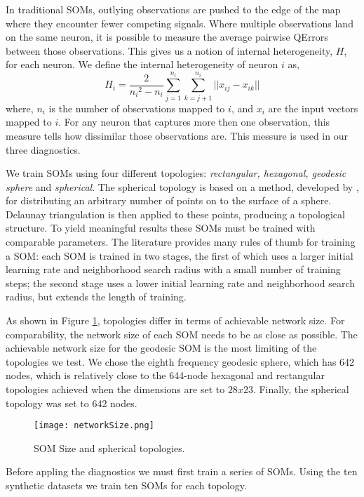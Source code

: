 In traditional SOMs, outlying observations are pushed to the edge of the map
where they encounter fewer competing signals.
Where multiple observations land on the same neuron, it is possible to measure
the average pairwise QErrors between those observations.  This gives us a
notion of internal heterogeneity, \(H\), for each neuron.  We define the
internal heterogeneity of neuron \(i\) as,
 \begin{equation}
   {H_i} = \frac{2}{{n_i}^2-{n_i}}\sum_{j=1}^{n_i}\sum_{k=j+1}^{n_i} ||{x_{ij}}-{x_{ik}}||
 \label{eqno1}
 \end{equation}
where, \(n_i\) is the number of observations mapped to \(i\), and \(x_i\) are
the input vectors mapped to \(i\).  For any neuron that captures more then one
observation, this measure tells how dissimilar those observations are.  This
messure is used in our three diagnostics.

We train SOMs using four different topologies:
\emph{rectangular, hexagonal, geodesic sphere} and \emph{spherical}.  The spherical
topology is based on a method, developed by \cite{Rakhmanov94}, for
distributing an arbitrary number of points on to the surface of a sphere.
Delaunay triangulation is then applied to these points, producing a
topological structure.  To yield meaningful results these SOMs must be trained
with comparable parameters.  The literature provides many rules of thumb for
training a SOM: each SOM is trained in two stages, the first of which uses a larger
initial learning rate and neighborhood search radius with a small number of
training steps; the second stage uses a lower initial learning rate and
neighborhood search radius, but extends the length of training.

As shown in Figure \ref{fig:nSize}, topologies differ in terms of achievable
network size.  For comparability, the network size of each SOM needs to be as
close as possible.  The achievable network size for the geodesic SOM is the
most limiting of the topologies we test. We chose the eighth frequency
geodesic sphere, which has 642 nodes, which is relatively close to the
644-node hexagonal and rectangular topologies achieved when the dimensions are
set to \(28x23\). Finally, the spherical topology was set to 642 nodes.

\begin{figure}[htb]
  \begin{center}
\caption{SOM Size and spherical topologies.}
\label{fig:nSize}
\texttt{[image: networkSize.png]}
\end{center}
\end{figure}

Before appling the diagnostics we must first train a series of SOMs.  Using the
ten synthetic datasets we train ten SOMs for each topology. 

